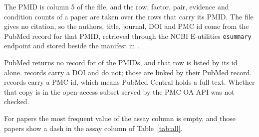The PMID is column 5 of the file, and the row, factor, pair, evidence and
condition counts of a paper are taken over the rows that carry its PMID. The
file gives no citation, so the authors, title, journal, DOI and PMC id come
from the PubMed record for that PMID, retrieved through the NCBI E-utilities
\texttt{esummary} endpoint and stored beside the manifest in
.

PubMed returns no record for \ytNNoPubmed{} of the \ytNPapers{} PMIDs, and that
row is listed by its id alone. \ytNDoi{} records carry a DOI and \ytNNoDoi{} do
not; those are linked by their PubMed record. \ytNPmc{} records carry a PMC id,
which means PubMed Central holds a full text. Whether that copy is in the
open-access subset served by the PMC OA API was not checked.

For \ytNNoAssayPapers{} papers the most frequent value of the assay column is
empty, and those papers show a dash in the assay column of Table~\ref{tab:all}.
